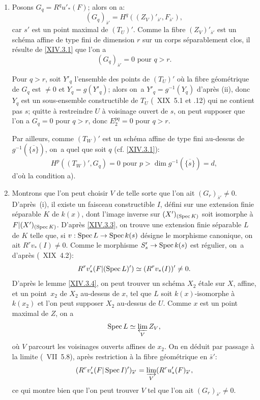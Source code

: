 \begin{enumerate}
\item[$1^\circ)$]
Posons $G_q = R^q u'_*(F)$; alors on a:
$$(G_q)_{\bar{s}'}=H^q((Z_V)'_{\bar{s}'}, F_{\bar{s}'}),
$$
car $s'$ est un point maximal de $(T_U)'$. Comme la fibre $(Z_V)'_{\bar{s}'}$ est un sch\'ema affine de type fini de dimension $r$ sur un corps s\'eparablement clos, il r\'esulte de \ref{XIV.3.1} que l'on a
$$(G_q)_{\bar{s}'}=0 \text{ pour } q>r.
$$

Pour $q>r$, soit $Y'_q$ l'ensemble des points de $(T_U)'$ o\`u la fibre g\'eom\'etrique de $G_q$ est $\neq 0$ et $Y_q=g(Y'_q)$; alors on~a $Y'_q = g^{-1}(Y_q)$ d'apr\`es \textup{(ii)}, donc $Y_q$ est un sous-ensemble constructible de $T_U$ (~XIX~5.1 et .12) qui ne contient pas $s$; quitte \`a restreindre $U$ \`a voisinage ouvert de $s$, on peut supposer que l'on a $G_q=0$ pour $q>r$, donc $E_2^{pq}=0$ pour $q>r$.

Par ailleurs, comme $(T_W)'$ est un sch\'ema affine de type fini au-dessus de $g^{-1}(\overline{\{s\}})$, on~a quel que soit $q$ (cf. \ref{XIV.3.1}):
$$H^p((T_W)', G_q)=0 \text{ pour } p>\dim g^{-1}(\overline{\{s\}})=d,
$$
d'o\`u la condition a).

\item[$2^\circ)$]
Montrons que l'on peut choisir $V$ de telle sorte que l'on ait $(G_r)_{\bar{s}'} \neq 0$. D'apr\`es~\textup{(i)}, il existe un faisceau constructible $I$, d\'efini sur une extension finie s\'eparable $K$ de $k(x)$, dont l'image inverse sur $(X')_{(\operatorname{Spec} K)}$ soit isomorphe \`a $F{|(X')_{(\operatorname{Spec} K)}}$. D'apr\`es \ref{XIV.3.3}, on trouve une extension finie s\'eparable $L$ de $K$ telle que, si $v:\Spec L \to \Spec k(s)$ d\'esigne le morphisme canonique, on ait $R^r v_*(I) \neq 0$. Comme le morphisme $S'_s \to \Spec k(s)$ est r\'egulier, on~a d'apr\`es (~XIX~4.2):
$$R^rv_*'(F{|(\operatorname{Spec} L)'}) \simeq (R^rv_*(I))' \neq 0.
$$
D'apr\`es le lemme \ref{XIV.3.4}, on peut trouver un sch\'ema $X_2$ \'etale sur $X$, affine, et un point~$x_2$ de $X_2$ au-dessus de $x$, tel que $L$ soit $k(x)$-isomorphe \`a $k(x_2)$ et l'on peut supposer $X_2$ au-dessus de $U$. Comme $x$ est un point maximal de $Z$, on a
$$
\operatorname{Spec} L \simeq \varprojlim_V Z_V,
$$
o\`u $V$ parcourt les voisinages ouverts affines de $x_2$. On en d\'eduit par passage \`a la limite (~VII~5.8), apr\`es restriction \`a la fibre g\'eom\'etrique en $\bar{s}'$:
$$
(R^rv_*'(F{|\operatorname{Spec} I})')_{\overline{s}'} = \varinjlim_V (R^ru_*'(F)_{\overline{s}'},
$$
ce qui montre bien que l'on peut trouver $V$ tel que l'on ait $(G_r)_{\bar{s}'} \neq 0$.


\end{enumerate}
